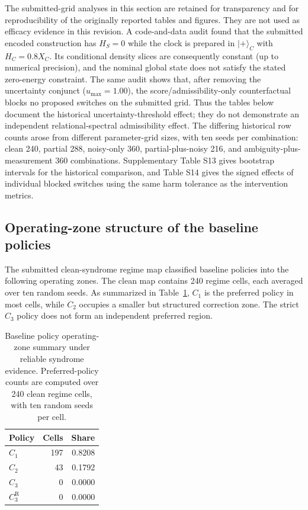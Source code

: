 \documentclass{iopjournal}
\begin{document}
The submitted-grid analyses in this section are retained for transparency and
for reproducibility of the originally reported tables and figures.  They are not
used as efficacy evidence in this revision.  A code-and-data audit found that the
submitted encoded construction has $H_S=0$ while the clock is prepared in
$|+\rangle_C$ with $H_C=0.8X_C$.  Its conditional density slices are consequently
constant (up to numerical precision), and the nominal global state does not
satisfy the stated zero-energy constraint.  The same audit shows that, after
removing the uncertainty conjunct ($u_{\max}=1.00$), the score/admissibility-only
counterfactual blocks no proposed switches on the submitted grid.  Thus the
tables below document the historical uncertainty-threshold effect; they do not
demonstrate an independent relational-spectral admissibility effect.
The differing historical row counts arose from different parameter-grid sizes,
with ten seeds per combination: clean 240, partial 288, noisy-only 360,
partial-plus-noisy 216, and ambiguity-plus-measurement 360 combinations.
Supplementary Table S13 gives bootstrap intervals for the historical
comparison, and Table S14 gives the signed effects of individual blocked
switches using the same harm tolerance as the intervention metrics.

\subsection{Operating-zone structure of the baseline policies}\label{subsec:results-operating-zones}

The submitted clean-syndrome regime map classified baseline policies into the
following operating zones. The clean map contains 240
regime cells, each averaged over ten random seeds. As summarized in
Table~\ref{tab:operating-zone-summary}, $C_1$ is the preferred policy in most
cells, while $C_2$ occupies a smaller but structured correction zone. The strict
$C_3$ policy does not form an independent preferred region.

\begin{table}[t]
\caption{Baseline policy operating-zone summary under reliable syndrome evidence.
Preferred-policy counts are computed over 240 clean regime cells, with ten random
seeds per cell.}
\label{tab:operating-zone-summary}
\centering
\scriptsize
\setlength{\tabcolsep}{5pt}
\begin{tabular}{@{}lrr@{}}
\toprule
Policy & Cells & Share \\
\midrule
$C_1$ & 197 & 0.8208 \\
$C_2$ & 43 & 0.1792 \\
$C_3$ & 0 & 0.0000 \\
$C_3^{\mathrm R}$ & 0 & 0.0000 \\
\bottomrule
\end{tabular}
\end{table}
\end{document}
